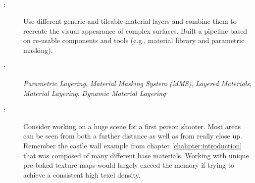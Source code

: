 \subsection{\patPatternLayering}\label{\patPatternLayering}
\begin{description}
	\item [\patIntent:]Use different generic and tileable material layers and combine them to recreate the visual appearance of complex surfaces. Built a pipeline based on re-usable components and tools (e.g., material library and parametric masking). %
	\item[\patAlsoKnownAs:] \emph{Parametric Layering}, \emph{Material Masking System (MMS)}, \emph{Layered Materials}, \emph{Material Layering}, \emph{Dynamic Material Layering}
	\item [\patMotivation:]	Consider working on a huge scene for a first person shooter. Most areas can be seen from both a further distance as well as from really close up.\,Remember the castle wall example from chapter \ref{chahpter:introduction} that was composed of many different base materials. Working with unique pre-baked texture maps would largely exceed the memory if trying to achieve a consistent high texel density.
	

\end{description}
